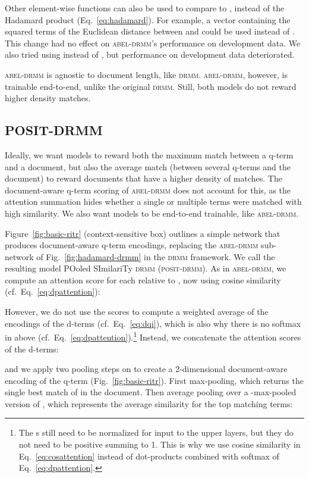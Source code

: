 \documentclass[11pt,a4paper]{article}
\newcommand{\drmm}{\textsc{drmm}\xspace}
\newcommand{\abeldrmm}{\textsc{abel-drmm}\xspace}
\newcommand{\positdrmm}{\textsc{posit-drmm}\xspace}
\begin{document}
Other element-wise functions can also be used to compare  to , instead of the Hadamard product (Eq.~\ref{eq:hadamard}). For example, a vector containing the squared terms of the Euclidean distance between  and  could be used instead of . This change had no effect on \abeldrmm's performance on development data. We also tried using  instead of , but performance on development data deteriorated. 

\abeldrmm is agnostic to document length, like \drmm. 
\abeldrmm, however, is trainable end-to-end, unlike the original \drmm. 
Still, both models do not reward higher density matches. 



\subsection{POSIT-DRMM}
\label{sec:ps-drmm}
\label{sec:posit-drmm}

Ideally, we want models to reward both the maximum match between a q-term and a document, but also the average 
match (between several q-terms and the document) to reward documents that have a higher density of matches. The document-aware q-term scoring of \abeldrmm does not account for this, as the attention summation hides whether a single or multiple terms were matched with high similarity. We also want models to be 
end-to-end trainable, like \abeldrmm.

Figure~\ref{fig:basic-ritr} (context-sensitive box) outlines a simple network that produces document-aware q-term encodings, 
replacing the \abeldrmm sub-network of Fig.~\ref{fig:hadamard-drmm} in the \drmm framework.
We call the resulting model POoled SImilariTy \drmm 
(\positdrmm). As in 
\abeldrmm, we compute an attention score  for each  relative to , now using cosine similarity (cf.\ Eq.~\ref{eq:dpattention}):

However, we do not use the  scores to compute a weighted average of the encodings of the d-terms 
(cf.\ Eq.~\ref{eq:dqi}), which is also why there is no softmax in  above (cf.\ Eq.~\ref{eq:dpattention}).\footnote{The s still need to be normalized for input to the upper layers, but they do not need to be positive summing to 1. This is why we use cosine similarity in Eq.~\ref{eq:cosattention} instead of dot-products combined with softmax of Eq.~\ref{eq:dpattention}. } 
Instead, we concatenate the attention scores of the  d-terms:

and we apply two pooling steps on  to create a 2-dimensional document-aware encoding  of the q-term  (Fig.~\ref{fig:basic-ritr}). First max-pooling, which returns the single best match of  in the document. Then average pooling over a -max-pooled version of , which represents the average similarity for the top  matching terms: 
\end{document}
